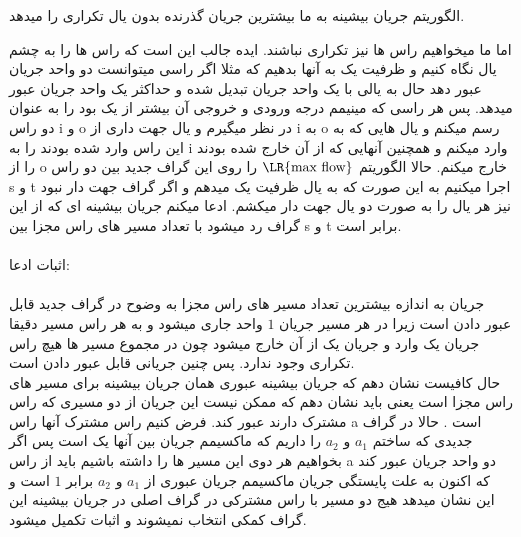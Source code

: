 \problem{}
الگوریتم جریان بیشینه به ما بیشترین جریان گذرنده بدون یال تکراری را میدهد.

اما ما میخواهیم راس ها نیز تکراری نباشند.
ایده جالب این است که راس ها را به چشم یال نگاه کنیم و ظرفیت یک به آنها بدهیم که مثلا
اگر راسی میتوانست دو واحد جریان عبور دهد حال به یالی با یک واحد جریان تبدیل شده
و حداکثر یک واحد جریان عبور میدهد.
پس هر راسی که مینیمم درجه ورودی و خروجی آن بیشتر از یک بود را به عنوان دو راس 
i و o در نظر میگیرم و یال جهت داری
از i به o رسم میکنم و یال هایی که به این راس وارد شده بودند را به 
i وارد میکنم 
و همچنین آنهایی که از آن خارج شده بودند را از o خارج میکنم.
حالا الگوریتم $\text{\LR{max flow}}$ را روی این گراف جدید بین دو راس s و t اجرا میکنیم
به این صورت که به یال ظرفیت یک میدهم و اگر گراف جهت دار نبود نیز هر یال را به صورت 
دو یال جهت دار میکشم.
ادعا میکنم جریان بیشینه ای که از این گراف رد میشود  با تعداد مسیر های
راس مجزا بین s و t برابر است.\\\\
اثبات ادعا:\\\\
جریان به اندازه بیشترین تعداد مسیر های راس مجزا به وضوح در گراف جدید قابل عبور دادن است 
زیرا در هر مسیر جریان $1$ واحد جاری میشود
و به هر راس مسیر دقیقا جریان یک وارد 
و جریان یک از آن خارج میشود چون در مجموع
مسیر ها هیچ راس تکراری وجود ندارد.
پس چنین جریانی قابل عبور دادن است.\\
حال کافیست نشان دهم که جریان بیشینه عبوری همان جریان بیشینه برای مسیر های راس مجزا است
یعنی باید نشان دهم که ممکن نیست این جریان
از دو مسیری که راس مشترک دارند عبور کند.
فرض کنیم راس مشترک آنها راس a است .
حالا در گراف جدیدی که ساختم $a_1$ و $a_2$
 را داریم که ماکسیمم جریان بین آنها یک است
 پس اگر بخواهیم هر دوی این مسیر ها را داشته باشیم
 باید از راس a دو واحد جریان عبور کند
 که اکنون به علت پایستگی جریان ماکسیمم جریان عبوری از $a_1$ و $a_2$
 برابر $1$ است و این نشان میدهد هیج دو مسیر با راس مشترکی در 
گراف اصلی در جریان بیشینه این گراف کمکی انتخاب نمیشوند و اثبات تکمیل میشود.